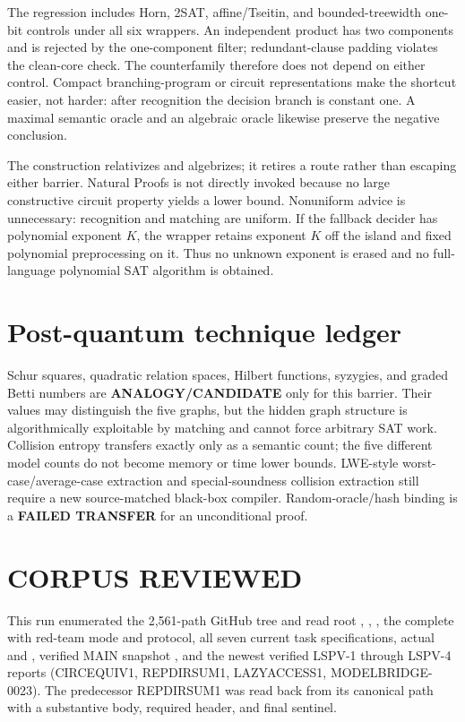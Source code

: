 \documentclass[11pt]{article}
\begin{document}
The regression includes Horn, 2SAT, affine/Tseitin, and bounded-treewidth
one-bit controls under all six wrappers.  An independent product has two
components and is rejected by the one-component filter; redundant-clause
padding violates the clean-core check.  The counterfamily therefore does not
depend on either control.  Compact branching-program or circuit
representations make the shortcut easier, not harder: after recognition the
decision branch is constant one.  A maximal semantic oracle and an algebraic
oracle likewise preserve the negative conclusion.

The construction relativizes and algebrizes; it retires a route rather than
escaping either barrier.  Natural Proofs is not directly invoked because no
large constructive circuit property yields a lower bound.  Nonuniform advice
is unnecessary: recognition and matching are uniform.  If the fallback
decider has polynomial exponent \(K\), the wrapper retains exponent \(K\) off
the island and fixed polynomial preprocessing on it.  Thus no unknown exponent
is erased and no full-language polynomial SAT algorithm is obtained.

\section{Post-quantum technique ledger}

Schur squares, quadratic relation spaces, Hilbert functions, syzygies, and
graded Betti numbers are \textbf{ANALOGY/CANDIDATE} only for this barrier.
Their values may distinguish the five graphs, but the hidden graph structure
is algorithmically exploitable by matching and cannot force arbitrary SAT
work.  Collision entropy transfers exactly only as a semantic count; the five
different model counts do not become memory or time lower bounds.  LWE-style
worst-case/average-case extraction and special-soundness collision extraction
still require a new source-matched black-box compiler.  Random-oracle/hash
binding is a \textbf{FAILED TRANSFER} for an unconditional proof.

\section{CORPUS REVIEWED}

This run enumerated the 2,561-path GitHub tree and read root
, , , the complete
 with red-team mode and protocol,
all seven current task specifications, actual  and
, verified MAIN snapshot
, and the newest
verified LSPV-1 through LSPV-4 reports (CIRCEQUIV1, REPDIRSUM1, LAZYACCESS1,
MODELBRIDGE-0023).  The predecessor REPDIRSUM1 was read back from its canonical
path with a substantive body, required header, and final sentinel.
\end{document}
